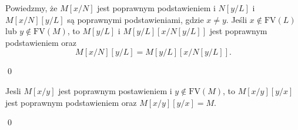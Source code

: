 \begin{fakt}
Powiedzmy, że \(M[x/N]\) jest poprawnym podstawieniem i \(N[y/L]\) i \(M[x/N][y/L]\) są poprawnymi podstawieniami, gdzie
  \(x\neq y\). Jeśli \(x\not\in \mathrm{FV}(L)\) lub \(y\not\in\mathrm{FV}(M)\), to \(M[y/L]\) i \( M[y/L]\left[x/N[y/L]\right] \) jest poprawnym podstawieniem oraz
  \[
    M[x/N][y/L]=M[y/L][x/N[y/L]].
  \]
\begin{dowod}
  \qed
\end{dowod}
\end{fakt}

\begin{fakt}
Jesli \(M[x/y]\) jest poprawnym postawieniem i \(y\not\in\mathrm{FV}(M)\), to \(M[x/y][y/x]\) jest poprawnym podstawieniem oraz
  \(M[x/y][y/x]=M\).
\begin{dowod}
  \qed
\end{dowod}
\end{fakt}


